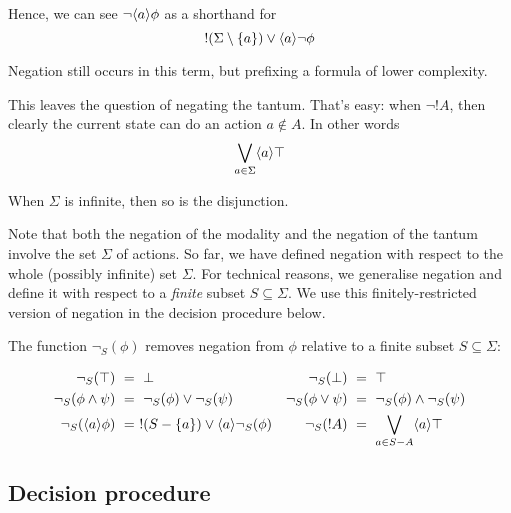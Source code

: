 \NI Hence, we can see $\neg \langle a \rangle \phi$ as a shorthand for 
\[
   !(\Sigma \setminus \{a\}) \lor \langle a \rangle \neg \phi
\]

\NI Negation still occurs in this term, but prefixing a formula of
lower complexity.

This leaves the question of negating the tantum. That's easy: when
$\neg !A$, then clearly the current state can do an action $a \notin
A$. In other words
\[
   \bigvee_{a \in \Sigma}\langle a \rangle \top
\]

\NI When $\Sigma$ is infinite, then so is the disjunction.

Note that both the negation of the modality and the negation of
the tantum involve the set $\Sigma$ of actions. 
So far, we have defined negation with respect to
the whole (possibly infinite) set $\Sigma$. For technical reasons, we
generalise negation and define it with respect to a \emph{finite}
subset $S \subseteq \Sigma$. We use this finitely-restricted version of
negation in the decision procedure below.

\begin{definition}
The function $\neg_{S}(\phi)$ removes negation from $\phi$
relative to a finite subset $S \subseteq \Sigma$:

\begin{align*}
  \neg_{S}(\top) &\ =\  \bot  &
  \neg_S(\bot) &\ =\  \top  \\
  \neg_S(\phi \land \psi) &\ =\  \neg_S(\phi) \lor \neg_S(\psi)  &
  \neg_S(\phi \lor \psi) &\ =\  \neg_S(\phi) \land \neg_S(\psi)  \\
  \neg_S(\langle a \rangle \phi) &\ =\  !(S-\{a\}) \lor \langle a \rangle \neg_S(\phi)  &
  \neg_S(! A) &\ =\  \bigvee_{a \in S - A} \langle a \rangle \top
\end{align*}


\end{definition}

\subsection{Decision procedure}


